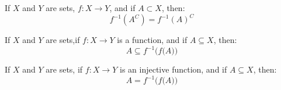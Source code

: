 \documentclass[crop=false,class=book,oneside]{standalone}
\begin{document}
        \begin{theorem}
            If $X$ and $Y$ are sets, $f:X\rightarrow{Y}$,
            and if $A\subset{X}$, then:
            \begin{equation}
                f^{-1}(A^{C})=f^{-1}(A)^{C}
            \end{equation}
        \end{theorem}
        \begin{theorem}
            If $X$ and $Y$ are sets,if
            $f:X\rightarrow{Y}$ is a function, and if
            $A\subseteq{X}$, then:
            \begin{equation}
                A\subseteq{f^{-1}\Big(f\big(A\big)\Big)}
            \end{equation}
        \end{theorem}
        \begin{theorem}
            If $X$ and $Y$ are sets, if
            $f:X\rightarrow{Y}$ is an injective function,
            and if $A\subseteq{X}$, then:
            \begin{equation}
                A=f^{-1}\Big(f\big(A\big)\Big)
            \end{equation}
        \end{theorem}
\end{document}

